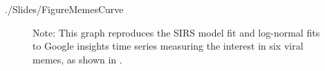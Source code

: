 {\begin{verbatimwrite}{./Slides/FigureMemesCurve}
\begin{figure}[!ht]
		\begin{flushleft}{\footnotesize Note: This graph reproduces the SIRS model fit and log-normal fits to Google insights time series measuring the interest in six viral memes, as shown in  \cite{bauckhage2011insights}. }
		\end{flushleft}
	\end{figure}
\end{verbatimwrite}%

}



